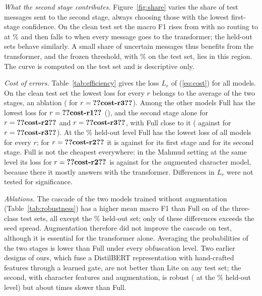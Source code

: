 \emph{What the second stage contributes.} Figure~\ref{fig:share} varies the share of test messages sent to the second stage, always choosing those with the lowest first-stage confidence. On the clean test set the macro F1 rises from  with no routing to  at \% and then falls to  when every message goes to the transformer; the held-out sets behave similarly. A small share of uncertain messages thus benefits from the transformer, and the frozen threshold, with \% on the test set, lies in this region. The curve is computed on the test set and is descriptive only.

\emph{Cost of errors.} Table~\ref{tab:efficiency} gives the loss $L_r$ of (\ref{eq:cost}) for all models. On the clean test set the lowest loss for every $r$ belongs to the average of the two stages, an ablation ( for $r=\val{cost-r3}$). Among the other models Full has the lowest loss for $r=\val{cost-r1}$ (), and the second stage alone for $r=\val{cost-r2}$ and $r=\val{cost-r3}$, with Full close to it ( against  for $r=\val{cost-r3}$). At the \% held-out level Full has the lowest loss of all models for every $r$; for $r=\val{cost-r2}$ it is  against  for its first stage and  for its second stage. Full is not the cheapest everywhere: in the Mahmud setting at the same level its loss for $r=\val{cost-r2}$ is  against  for the augmented character model, because there it mostly answers with the transformer. Differences in $L_r$ were not tested for significance.

\emph{Ablations.} The cascade of the two models trained without augmentation (Table~\ref{tab:robustness}) has a higher mean macro F1 than Full on  of the  three-class test sets, all except the \% held-out set; only  of these differences exceeds the seed spread. Augmentation therefore did not improve the cascade on test, although it is essential for the transformer alone. Averaging the probabilities of the two stages is lower than Full under every obfuscation level. Two earlier designs of ours, which fuse a DistilBERT representation with hand-crafted features through a learned gate, are not better than Lite on any test set; the second, with character features and augmentation, is robust ( at the \% held-out level) but about  times slower than Full.

